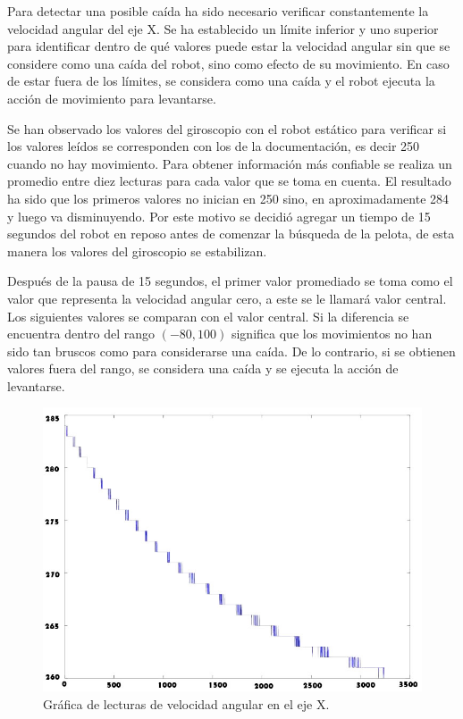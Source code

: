 Para detectar una posible caída ha sido necesario verificar constantemente la velocidad angular del eje X. Se ha establecido un límite inferior y uno superior para identificar dentro de qué valores puede estar la velocidad angular sin que se considere como una caída del robot, sino como efecto de su movimiento. En caso de estar fuera de los límites, se considera como una caída y el robot ejecuta la acción de movimiento para levantarse.  

Se han observado los valores del giroscopio con el robot estático para verificar si los valores leídos se corresponden con los de la documentación, es decir 250 cuando no hay movimiento. Para obtener información más confiable se realiza un promedio entre diez lecturas para cada valor que se toma en cuenta. El resultado ha sido que los primeros valores no inician en 250 sino, en aproximadamente 284 y luego va disminuyendo. Por este motivo se decidió agregar un tiempo de 15 segundos del robot en reposo antes de comenzar la búsqueda de la pelota, de esta manera los valores del giroscopio se estabilizan. 

Después de la pausa de 15 segundos, el primer valor promediado se toma como el valor que representa la velocidad angular cero, a este se le llamará valor central. Los siguientes valores se comparan con el valor central. Si la diferencia se encuentra dentro del rango $(-80,100)$ significa que los movimientos no han sido tan bruscos como para considerarse una caída. De lo contrario, si se obtienen valores fuera del rango, se considera una caída y se ejecuta la acción de levantarse.   


\begin{figure}[hbtp]
\centering
\includegraphics[scale=0.4]{imagenes/grafica1.jpg}
\caption{Gráfica de lecturas de velocidad angular en el eje X.}
\label{fig:grafica1}
\end{figure} 